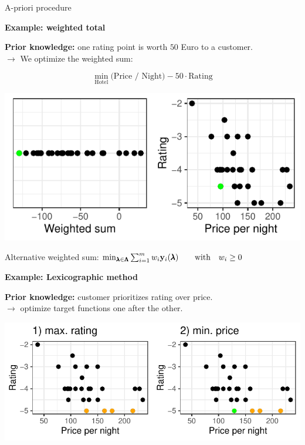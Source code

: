 \begin{frame}[allowframebreaks]{A-priori procedure}

\textbf{Example: weighted total}


\textbf{Prior knowledge:} one rating point is worth $50$ Euro to a customer. \\ $\to$ We optimize the weighted sum:

$$
\min_\text{Hotel} \text{(Price / Night)} - 50 \cdot \text{Rating}
$$

    \begin{center}
\includegraphics[scale=0.555555]{images/expedia-9-1}
    \end{center}

    Alternative weighted sum: $\min_{\pmb{\lambda} \in \pmb{\Lambda}} \sum_{i = 1}^m w_i \mathbf{y}_i(\pmb{\lambda}) \qquad \text{with} \quad w_i \ge 0 $

\framebreak

\textbf{Example: Lexicographic method}

\lz

\textbf{Prior knowledge:} customer prioritizes rating over price. \\
$\to$ optimize target functions one after the other.

\lz

    \begin{center}
\includegraphics[scale=1]{images/expedia-10-1}
    \end{center}


\end{frame}
